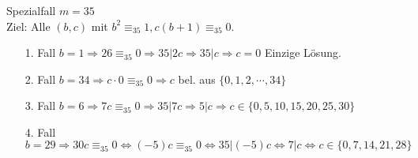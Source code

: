 \documentclass[mitschriften.tex]{subfiles}
\begin{document}
\subsubsection{}
Spezialfall $m=35$\\
Ziel: Alle $(b,c)$ mit $b^2 \equiv_{35} 1, c(b+1) \equiv_{35} 0$.\\
\begin{itemize}
	\item [1. Fall ] $b=1 \Rightarrow 26 \equiv_{35} 0 \Rightarrow35|2c \Rightarrow 35|c \Rightarrow c=0$ Einzige Lösung.
	\item[2. Fall ] $b=34 \Rightarrow c \cdot 0 \equiv_{35} 0 \Rightarrow c$ bel. aus $\{0,1,2,\cdots,34\}$
	\item[3. Fall ] $b = 6 \Rightarrow 7c \equiv_{35} 0 \Rightarrow 35|7c \Rightarrow 5|c \Rightarrow c\in \{0,5,10,15,20,25,30\}$
	\item[4. Fall ] $b =29 \Rightarrow 30c \equiv_{35} 0 \Leftrightarrow (-5)c \equiv_{35} 0 \Leftrightarrow 35| (-5)c \Leftrightarrow 7|c \Leftrightarrow c \in \{0,7,14,21,28\}$
\end{itemize}
\end{document}
